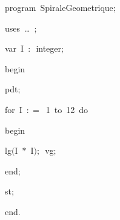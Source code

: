 
{
\parindent {}
\medskip

\carrenoir
\vspace{\neglskip}\mbox{\blc  \idt  \mcl program\idt \label{prog:SpiraleGeometrique}\ SpiraleGeometrique$;$
}\par 
\vspace{\neglskip}\mbox{\blc \blk\idt \mcl uses\idt \ \ldots\ $;$
}\par 
\pagebreak[3] 
\vspace{\neglskip}\mbox{\blc  \blk\idt  \mcl var\idt \ I\ $:$\ integer$;$}\par 
\vspace{\neglskip}\mbox{\blc  \idt  \mcl begin\idt }\par 
\vspace{\neglskip}\mbox{\blc  \blk\idt  pdt$;$\ }\par 
\pagebreak[3] 
\vspace{\neglskip}\mbox{\blc  \blk\idt  \mcl for\idt \ I\ $:$$=$\ 1\ \mcl to\idt \ 12\ \mcl do\idt }\par 
\vspace{\neglskip}\mbox{\blc  \blk\blk\idt  \mcl begin\idt }\par 
\vspace{\neglskip}\mbox{\blc  \blk\blk\blk\idt  lg$($I\ $\ast$\ I$)$$;$\ vg$;$}\par 
\vspace{\neglskip}\mbox{\blc  \blk\blk\idt  \mcl end\idt $;$}\par 
\vspace{\neglskip}\mbox{\blc  \blk\idt  st$;$\ }\par 
\vspace{\neglskip}\mbox{\blc  \idt  \mcl end\idt $.$}\par 

\medskip }

